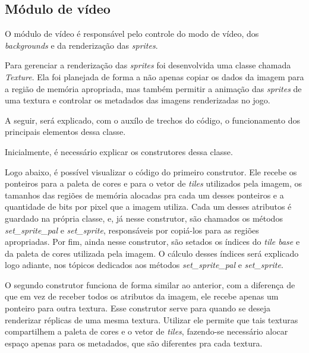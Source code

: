 \subsection{Módulo de vídeo}

O módulo de vídeo é responsável pelo controle do modo de vídeo, dos \textit{backgrounds} e da renderização das \textit{sprites}.

Para gerenciar a renderização das \textit{sprites} foi desenvolvida uma classe chamada \textit{Texture}. Ela foi planejada de forma a não apenas copiar os dados da imagem para a região de memória apropriada, mas também permitir a animação das \textit{sprites} de uma textura e controlar os metadados das imagens renderizadas no jogo.

A seguir, será explicado, com o auxílo de trechos do código, o funcionamento dos principais elementos dessa classe.

Inicialmente, é necessário explicar os construtores dessa classe.

Logo abaixo, é possível visualizar o código do primeiro construtor. Ele recebe os ponteiros para a paleta de cores e para o vetor de \textit{tiles} utilizados pela imagem, os tamanhos das regiões de memória alocadas pra cada um desses ponteiros e a quantidade de bits por pixel que a imagem utiliza. Cada um desses atributos é guardado na própria classe, e, já nesse construtor, são chamados os métodos \textit{set\_sprite\_pal} e \textit{set\_sprite}, responsáveis por copiá-los para as regiões apropriadas. Por fim, ainda nesse construtor, são setados os índices do \textit{tile base} e da paleta de cores utilizada pela imagem. O cálculo desses índices será explicado logo adiante, nos tópicos dedicados aos métodos \textit{set\_sprite\_pal} e \textit{set\_sprite}.

O segundo construtor funciona de forma similar ao anterior, com a diferença de que em vez de receber todos os atributos da imagem, ele recebe apenas um ponteiro para outra textura. Esse construtor serve para quando se deseja renderizar réplicas de uma mesma textura. Utilizar ele permite que tais texturas compartilhem a paleta de cores e o vetor de \textit{tiles}, fazendo-se necessário alocar espaço apenas para os metadados, que são diferentes pra cada textura.



